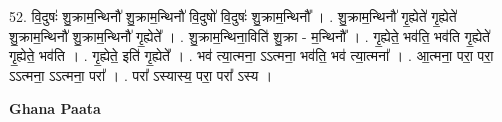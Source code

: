 \documentclass[17pt]{extarticle}
\begin{document}
52. वि॒दुषः॑ शु॒क्राम॒न्थिनौ॑ शु॒क्राम॒न्थिनौ॑ वि॒दुषो॑ वि॒दुषः॑ शु॒क्राम॒न्थिनौ᳚ । . शु॒क्राम॒न्थिनौ॑ गृ॒ह्येते॑ गृ॒ह्येते॑ शु॒क्राम॒न्थिनौ॑ शु॒क्राम॒न्थिनौ॑ गृ॒ह्येते᳚ । . शु॒क्राम॒न्थिना॒विति॑ शु॒क्रा - म॒न्थिनौ᳚ । . गृ॒ह्येते॒ भव॑ति॒ भव॑ति गृ॒ह्येते॑ गृ॒ह्येते॒ भव॑ति । . गृ॒ह्येते॒ इति॑ गृ॒ह्येते᳚ । . भव॑ त्या॒त्मना॒ ऽऽत्मना॒ भव॑ति॒ भव॑ त्या॒त्मना᳚ । . आ॒त्मना॒ परा॒ परा॒ ऽऽत्मना॒ ऽऽत्मना॒ परा᳚ । . परा᳚ ऽस्यास्य॒ परा॒ परा᳚ ऽस्य । \newline

\textbf{Ghana Paata } \newline
\end{document}
